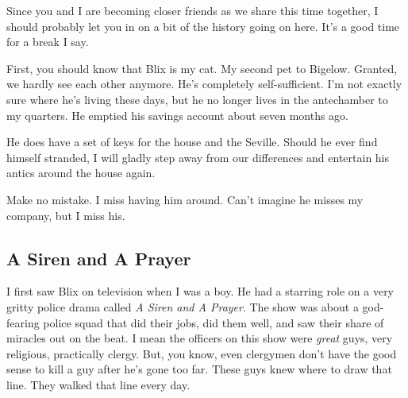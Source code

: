 \documentclass[10pt,twoside]{report}
\begin{document}
Since you and I are becoming closer friends as we share this time
together, I should probably let you in on a bit of the history going
on here.  It's a good time for a break I say.

First, you should know that Blix is my cat.  My second pet to
Bigelow. Granted, we hardly see each other anymore.  He's completely
self-sufficient. I'm not exactly sure where he's living these days,
but he no longer lives in the antechamber to my quarters.  He emptied
his savings account about seven months ago.

He does have a set of keys for the house and the Seville.  Should he
ever find himself stranded, I will gladly step away from our
differences and entertain his antics around the house again.

Make no mistake.  I miss having him around.  Can't imagine he misses
my company, but I miss his.



\subsection{A Siren and A Prayer}



I first saw Blix on television when I was a boy.  He had a starring
role on a very gritty police drama called {\em A Siren and A Prayer}.
The show was about a god-fearing police squad that did their jobs, did
them well, and saw their share of miracles out on the beat.  I mean
the officers on this show were {\em great} guys, very religious,
practically clergy.  But, you know, even clergymen don't have the good
sense to kill a guy after he's gone too far. These guys knew where to
draw that line.  They walked that line every day.
\end{document}
